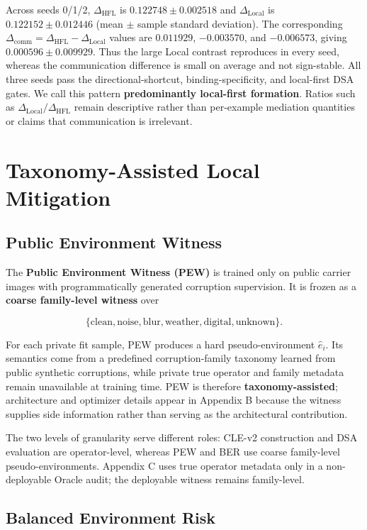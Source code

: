 Across seeds 0/1/2, \(\Delta_{\mathrm{HFL}}\) is
\(0.122748\pm0.002518\) and \(\Delta_{\mathrm{Local}}\) is
\(0.122152\pm0.012446\) (mean \(\pm\) sample standard deviation). The corresponding
\(\Delta_{\mathrm{comm}}=\Delta_{\mathrm{HFL}}-\Delta_{\mathrm{Local}}\) values are
\(0.011929\), \(-0.003570\), and \(-0.006573\), giving
\(0.000596\pm0.009929\). Thus the large Local contrast reproduces in every seed,
whereas the communication difference is small on average and not sign-stable. All three seeds pass the directional-shortcut, binding-specificity, and local-first DSA gates. We call this pattern \textbf{predominantly local-first formation}. Ratios such as \(\Delta_{\mathrm{Local}}/\Delta_{\mathrm{HFL}}\) remain descriptive rather than per-example mediation quantities or claims that communication is irrelevant.

\section{Taxonomy-Assisted Local Mitigation}

\subsection{Public Environment Witness}

The \textbf{Public Environment Witness (PEW)} is trained only on public carrier images with programmatically generated corruption supervision. It is frozen as a \textbf{coarse family-level witness} over

\[
\{\text{clean},\text{noise},\text{blur},\text{weather},\text{digital},\text{unknown}\}.
\]

For each private fit sample, PEW produces a hard pseudo-environment \(\hat e_i\). Its semantics come from a predefined corruption-family taxonomy learned from public synthetic corruptions, while private true operator and family metadata remain unavailable at training time. PEW is therefore \textbf{taxonomy-assisted}; architecture and optimizer details appear in Appendix B because the witness supplies side information rather than serving as the architectural contribution.

The two levels of granularity serve different roles: CLE-v2 construction and DSA evaluation are operator-level, whereas PEW and BER use coarse family-level pseudo-environments. Appendix C uses true operator metadata only in a non-deployable Oracle audit; the deployable witness remains family-level.

\subsection{Balanced Environment Risk}

